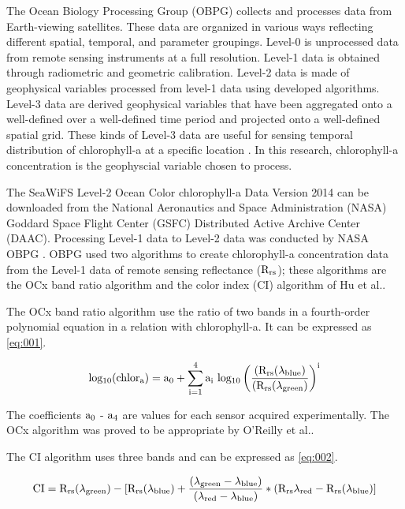 The Ocean Biology Processing Group (OBPG) collects and processes data from Earth-viewing satellites. These data are organized in various ways reflecting different spatial, temporal, and parameter groupings. Level-0 is unprocessed data from remote sensing instruments at a full resolution. Level-1 data is obtained through radiometric and geometric calibration. Level-2 data is made of geophysical variables processed from level-1 data using developed algorithms. Level-3 data are derived geophysical variables that have been aggregated onto a well-defined over a well-defined time period and projected onto a well-defined spatial grid. These kinds of Level-3 data are useful for sensing temporal distribution of chlorophyll-a at a specific location \cite{feldman2017ocean}. In this research, chlorophyll-a concentration is the geophyscial variable chosen to process.

The SeaWiFS Level-2 Ocean Color chlorophyll-a Data Version 2014 can be downloaded from the National Aeronautics and Space Administration (NASA) Goddard Space Flight Center (GSFC) Distributed Active Archive Center (DAAC). Processing Level-1 data to Level-2 data was conducted by NASA OBPG \cite{NASASeaFiWSdata}. OBPG used two algorithms to create chlorophyll-a concentration data from the Level-1 data of remote sensing reflectance ($\rm R_{rs}$); these algorithms are the OCx band ratio algorithm and the color index (CI) algorithm of Hu et al.\cite{hu2012chlorophyll}. 

The OCx band ratio algorithm use the ratio of two bands in a fourth-order polynomial equation in a relation with chlorophyll-a. It can be expressed as \eqref{eq:001}.
 
 \begin{equation}
 {\rm log_{10} (chlor_a) = a_0 + \sum_{i=1}^4 a_i ~ log_{10} \left( \frac{(R_{rs}(\lambda_{blue})}{(R_{rs}(\lambda_{green})} \right) ^i }
 \label{eq:001}
 \end{equation}
 
The coefficients $\rm a_0$ - $\rm a_4$ are values for each sensor acquired experimentally. The OCx algorithm was proved to be appropriate by O’Reilly et al.\cite{o2000ocean}. 

The CI algorithm uses three bands and can be expressed as \eqref{eq:002}.

 \begin{equation}
{\rm CI = R_{rs} ({\lambda}_{green}) - [R_{rs} ({\lambda}_{blue}) + \frac {({\lambda}_{green} - {\lambda}_{blue})} {({\lambda}_{red} - {\lambda}_{blue})} * (R_{rs}{\lambda}_{red} - R_{rs} ({\lambda}_{blue}) ]}
\label{eq:002}
\end{equation}

